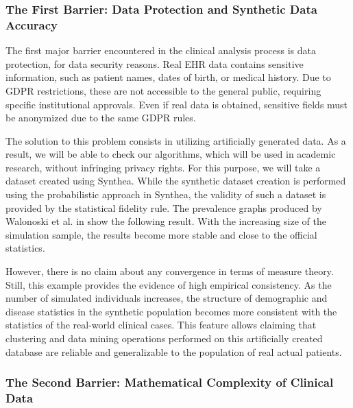 \subsubsection*{The First Barrier: Data Protection and Synthetic Data Accuracy}

The first major barrier encountered in the clinical analysis process is data protection, for data security reasons. Real EHR data contains sensitive information, such as patient names, dates of birth, or medical history. Due to GDPR restrictions, these are not accessible to the general public, requiring specific institutional approvals. Even if real data is obtained, sensitive fields must be anonymized due to the same GDPR rules.

The solution to this problem consists in utilizing artificially generated data. As a result, we will be able to check our algorithms, which will be used in academic research, without infringing privacy rights. For this purpose, we will take a dataset created using Synthea. While the synthetic dataset creation is performed using the probabilistic approach in Synthea, the validity of such a dataset is provided by the statistical fidelity rule. The prevalence graphs produced by Walonoski et al. in \cite{walonoski2017} show the following result. With the increasing size of the simulation sample, the results become more stable and close to the official statistics.

However, there is no claim about any convergence in terms of measure theory. Still, this example provides the evidence of high empirical consistency. As the number of simulated individuals increases, the structure of demographic and disease statistics in the synthetic population becomes more consistent with the statistics of the real-world clinical cases. This feature allows claiming that clustering and data mining operations performed on this artificially created database are reliable and generalizable to the population of real actual patients.

\subsubsection*{The Second Barrier: Mathematical Complexity of Clinical Data}


